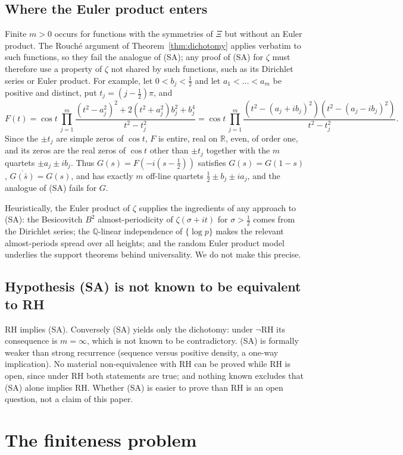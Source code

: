 \documentclass[11pt]{amsart}
\theoremstyle{definition}
\theoremstyle{remark}
\newcommand{\RH}{\mathrm{RH}}
\newcommand{\bbR}{\mathbb{R}}
\newcommand{\bbQ}{\mathbb{Q}}
\begin{document}
\subsection{Where the Euler product enters}\label{ssec:euler}
Finite $m>0$ occurs for functions with the symmetries of $\Xi$ but without an
Euler product. The Rouch\'e argument of Theorem~\ref{thm:dichotomy} applies
verbatim to such functions, so they fail the analogue of (SA); any proof of
(SA) for $\zeta$ must therefore use a property of $\zeta$ not shared by such functions, such as
its Dirichlet series or Euler product. For example, let
$0<b_j<\tfrac12$ and let $a_1<\dots<a_m$ be positive and distinct, put
$t_j=(j-\tfrac12)\pi$, and
\[
F(t)=\cos t\,\prod_{j=1}^m
\frac{(t^2-a_j^2)^2+2(t^2+a_j^2)b_j^2+b_j^4}{t^2-t_j^2}
=\cos t\,\prod_{j=1}^m\frac{(t^2-(a_j+ib_j)^2)(t^2-(a_j-ib_j)^2)}{t^2-t_j^2}.
\]
Since the $\pm t_j$ are simple zeros of $\cos t$, $F$ is entire, real on
$\bbR$, even, of order one, and its zeros are the real zeros of $\cos t$
other than $\pm t_j$ together with the $m$ quartets $\pm a_j\pm ib_j$. Thus
$G(s)=F(-i(s-\tfrac12))$ satisfies $G(s)=G(1-s)$, $\overline{G(\bar s)}=G(s)$,
and has exactly $m$ off-line quartets $\tfrac12\pm b_j\pm ia_j$, and the analogue of (SA) fails for $G$.

Heuristically, the Euler product of $\zeta$ supplies the ingredients of any
approach to (SA): the Besicovitch $B^2$ almost-periodicity of $\zeta(\sigma+it)$
for $\sigma>\tfrac12$ comes from the Dirichlet series; the $\bbQ$-linear
independence of $\{\log p\}$ makes the relevant almost-periods spread over
all heights; and the random Euler product model underlies the support
theorems behind universality. We do not make this precise.

\subsection{Hypothesis (SA) is not known to be equivalent to RH}\label{ssec:notequiv}
RH implies (SA). Conversely (SA) yields only the dichotomy: under $\neg\RH$
its consequence is $m=\infty$, which is not known to be contradictory. (SA)
is formally weaker than strong recurrence (sequence versus positive density,
a one-way implication). No material non-equivalence with RH can be proved
while RH is open, since under RH both statements are true; and nothing
known excludes that (SA) alone implies RH. Whether (SA) is easier to prove
than RH is an open question, not a claim of this paper.

\section{The finiteness problem}\label{sec:finiteness}
\end{document}
